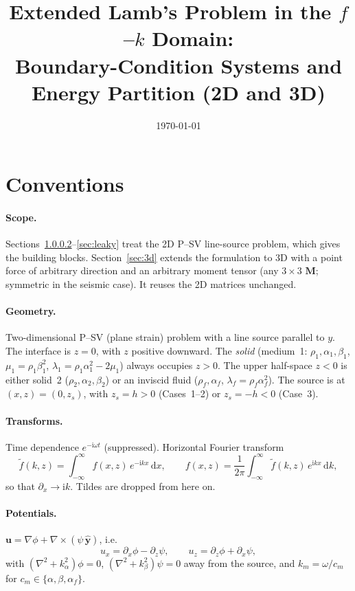 \documentclass[11pt,a4paper]{article}
\title{Extended Lamb's Problem in the \texorpdfstring{$f$--$k$}{f-k} Domain:\\
Boundary-Condition Systems and Energy Partition (2D and 3D)}
\author{}
\date{\today}
\newcommand{\ii}{\mathrm{i}}
\newcommand{\dd}{\mathrm{d}}
\begin{document}
\maketitle

\tableofcontents

\section{Conventions}

\paragraph{Scope.} Sections~\ref{sec:conv-start}--\ref{sec:leaky} treat the 2D P--SV line-source
problem, which gives the building blocks. Section~\ref{sec:3d} extends the formulation to 3D with a
point force of arbitrary direction and an arbitrary moment tensor (any $3\times3$ $\mathbf M$; symmetric in the seismic case). It
reuses the 2D matrices unchanged.

\paragraph{Geometry.}\label{sec:conv-start} Two-dimensional P--SV (plane strain) problem with a line source
parallel to $y$. The interface is $z=0$, with $z$ positive downward. The \emph{solid}
(medium~1: $\rho_1,\alpha_1,\beta_1$, $\mu_1=\rho_1\beta_1^2$, $\lambda_1=\rho_1\alpha_1^2-2\mu_1$)
always occupies $z>0$. The upper half-space $z<0$ is either solid~2
($\rho_2,\alpha_2,\beta_2$) or an inviscid fluid ($\rho_f,\alpha_f$, $\lambda_f=\rho_f\alpha_f^2$).
The source is at $(x,z)=(0,z_s)$, with $z_s=h>0$ (Cases~1--2) or $z_s=-h<0$ (Case~3).

\paragraph{Transforms.} Time dependence $e^{-\ii\omega t}$ (suppressed). Horizontal Fourier transform
\begin{equation}
  \tilde f(k,z)=\int_{-\infty}^{\infty} f(x,z)\,e^{-\ii kx}\,\dd x,
  \qquad
  f(x,z)=\frac{1}{2\pi}\int_{-\infty}^{\infty}\tilde f(k,z)\,e^{\ii kx}\,\dd k ,
\end{equation}
so that $\partial_x\to\ii k$. Tildes are dropped from here on.

\paragraph{Potentials.} $\mathbf u=\nabla\phi+\nabla\times(\psi\,\hat{\mathbf y})$, i.e.
\begin{equation}
  u_x=\partial_x\phi-\partial_z\psi,\qquad u_z=\partial_z\phi+\partial_x\psi,
\end{equation}
with $(\nabla^2+k_\alpha^2)\phi=0$, $(\nabla^2+k_\beta^2)\psi=0$ away from the source, and
$k_m=\omega/c_m$ for $c_m\in\{\alpha,\beta,\alpha_f\}$.
\end{document}
